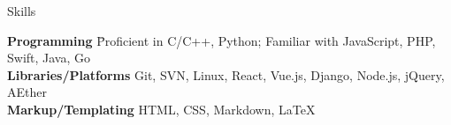 \begin{MySection}{Skills}
    \vspace{-15pt}
    \begin{tabbing}
        \textbf{Programming}
        \hspace{4em}
        \= Proficient in C/C++, Python;
        Familiar with JavaScript, PHP, Swift, Java, Go\\
        \textbf{Libraries/Platforms}
        \> Git, SVN, Linux, React, Vue.js, Django, Node.js, jQuery, AEther\\
        \textbf{Markup/Templating}
        \> HTML, CSS, Markdown, \LaTeX
    \end{tabbing}
    \vspace{-1in}
\end{MySection}